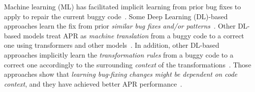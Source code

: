 Machine learning (ML)
has facilitated implicit learning from prior bug fixes to apply to repair
the current buggy
code~\cite{long2016automatic,long2017automatic,saha2017elixir}.
Some Deep Learning (DL)-based approaches learn the fix from prior {\em
  similar bug fixes and/or
  patterns}~\cite{gupta2017deepfix,white2019sorting,white2016deep}.
Other DL-based models treat APR as {\em machine translation} from a
buggy code to a correct one using transformers and other
models~\cite{chakrabortycodit,chen2018sequencer,hata2018learning,tufano2018empirical,see2017get}.
In addition, other DL-based approaches implicitly learn the {\em
  transformation rules} from a buggy code to a correct one accordingly
to the surrounding {\em context} of the
transformations~\cite{chen2018sequencer,icse20,cure-icse21,lutellier2020coconut}.
Those approaches show that {\em learning bug-fixing changes might be
  dependent on {\em code context}}, and they 
have achieved better APR
performance~\cite{icse20,lutellier2020coconut,cure-icse21}.


